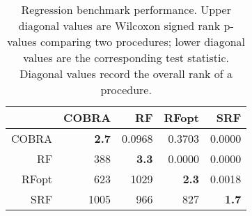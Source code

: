 \documentclass{bmcart}
\def\RFopt{RFopt}
\begin{document}
\begin{backmatter}
\vskip20pt
\begin{table}[htb!]
\caption{Regression benchmark performance.
  Upper diagonal values are Wilcoxon signed rank p-values comparing
  two procedures; lower diagonal values are the corresponding test
  statistic.  Diagonal values record the overall rank of a procedure.}
\centering
\begin{tabular}{rrrrr}
  \hline
 & COBRA & RF & \RFopt & SRF \\ 
  \hline
COBRA & \bf{2.7} & 0.0968 & 0.3703 & 0.0000 \\ 
  RF & 388& \bf{3.3} & 0.0000 & 0.0000 \\ 
  \RFopt & 623 & 1029 & \bf{2.3} & 0.0018 \\ 
  SRF & 1005 & 966 & 827 & \bf{1.7} \\ 
   \hline
\end{tabular}
\end{table}




\end{backmatter}
\end{document}
